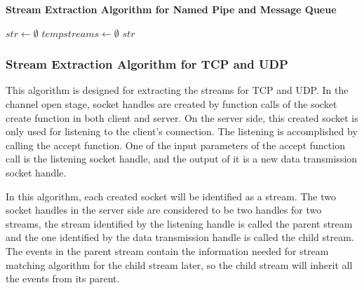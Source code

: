 \begin{algorithm}[H]
\DontPrintSemicolon
\caption{{\bf Stream Extraction Algorithm for Named Pipe and Message Queue} \label{streamext1}}
$str \leftarrow \emptyset$\; 
$tempstreams \leftarrow \emptyset$\;
\KwRet $str$\;
\end{algorithm} 

\subsubsection{Stream Extraction Algorithm for TCP and UDP}
This algorithm is designed for extracting the streams for TCP and UDP. In the channel open stage, socket handles are created by function calls of the socket create function in both client and server. On the server side, this created socket is only used for listening to the client's connection. The listening is accomplished by calling the accept function. One of the input parameters of the accept function call is the listening socket handle, and the output of it is a new data transmission socket handle. 


In this algorithm, each created socket will be identified as a stream. The two socket handles in the server side are considered to be two handles for two streams, the stream identified by the listening handle is called the parent stream and the one identified by the data transmission handle is called the child stream. The events in the parent stream contain the information needed for stream matching algorithm for the child stream later, so the child stream will inherit all the events from its parent. 

